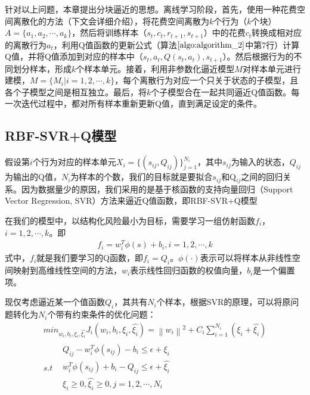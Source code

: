 针对以上问题，本章提出分块逼近的思想。离线学习阶段，首先，使用一种花费空间离散化的方法（下文会详细介绍），将花费空间离散为$k$个行为（$k$个块）$A=\{a_{1},a_{2},\cdots,a_{k}\}$，然后将训练样本（$s_{t},c_{t},r_{t+1},s_{t+1}$）中的花费$c_{t}$转换成相对应的离散行为$a_{t}$，利用Q值函数的更新公式（算法$\ref{algo:algorithm_2}$中第7行）计算Q值，并将Q值添加到对应的样本中（$s_{t},a_{t},Q(s_{t},a_{t}),s_{t+1}$）。然后根据行为的不同划分样本，形成$k$个样本单元。接着，利用非参数化逼近模型$M$对样本单元进行建模，$M=\{M_{i}|i=1,2,\cdots,k\}$，每个离散行为对应一个只关于状态的子模型，且各个子模型之间是相互独立。最后，将$k$个子模型合在一起共同逼近Q值函数。每一次迭代过程中，都对所有样本重新更新Q值，直到满足设定的条件。

\subsection{RBF-SVR+Q模型}
假设第$i$个行为对应的样本单元$X_{i}=\{(s_{ij},Q_{ij})\}_{j=1}^{N_{i}}$，其中$s_{ij}$为输入的状态，$Q_{ij}$为输出的Q值，$N_{i}$为样本的个数，我们的目标就是要拟合$s_{ij}$和Q$_{ij}$之间的回归关系。因为数据量少的原因，我们采用的是基于核函数的支持向量回归（Support Vector Regression, SVR）方法来逼近Q值函数，即RBF-SVR+Q模型

在我们的模型中，以结构化风险最小为目标，需要学习一组仿射函数$f_{i}$，$i=1,2,\cdots,k$。即
\begin{equation}
\begin{aligned}
f_{i}=w_{i}^{T} \phi(s) + b_{i}, i=1,2,\cdots,k
\end{aligned}
\end{equation}
式中，$f_{i}$就是我们要学习的Q函数，即$f_{i}=Q_{i}$。$\phi(\cdot)$表示可以将样本从非线性空间映射到高维线性空间的方法，$w_{i}$表示线性回归函数的权值向量，$b_{i}$是一个偏置项。

现仅考虑逼近某一个值函数$Q_{i}$，其共有$N_{i}$个样本，根据SVR的原理，可以将原问题转化为$N_{i}$个带有约束条件的优化问题：
\begin{equation}
\begin{aligned}
min_{w_{i},b_{i},\xi_{i},\hat{\xi_{i}}} J_{i}(w_{i},b_{i},\xi_{i},\hat{\xi_{i}}) = \left \| w_{i} \right \|^{2} + C_{i} \sum_{i=1}^{N_{i}}(\xi_{i}+\hat{\xi_{i}})\\ 
s.t \begin{matrix}
 &Q_{ij}-w_{i}^{T} \phi(s_{ij}) - b_{i} \leqslant \epsilon + \xi_{i}\\
 &w_{i}^{T} \phi(s_{ij}) + b_{i} - Q_{ij} \leqslant \epsilon + \hat{\xi_{i}} \\
 &\xi_{i} \geqslant 0,\hat{\xi_{i}} \geqslant 0, j=1,2,\cdots,N_{i}\\
\end{matrix}
\end{aligned}
\end{equation}

